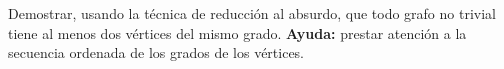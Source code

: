
\item\Obligatorio Demostrar, usando la técnica de reducción al absurdo, que todo grafo no trivial tiene al menos dos vértices del mismo grado.  \textbf{Ayuda:} prestar atención a la secuencia ordenada de los grados de los vértices.


